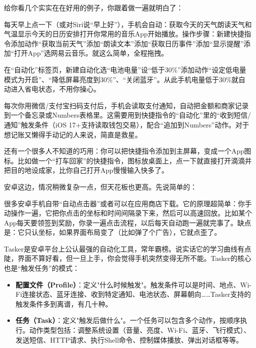 给你看几个实实在在好用的例子，你跟着做一遍就明白了：


每天早上点一下（或对Siri说“早上好”），手机会自动：获取今天的天气朗读天气和气温显示今天的日历安排打开你常用的音乐App开始播放。操作步骤：新建快捷指令添加动作“获取当前天气”添加“朗读文本”添加“获取日历事件”添加“显示提醒”添加“打开App”选网易云音乐。就这么简单，全程拖拽。


在“自动化”标签页，新建自动化选“电池电量”设“低于30\%”添加动作“设定低电量模式为开启”、“降低屏幕亮度到30\%”、“关闭蓝牙”。从此手机电量低于30\%就自动进入省电状态，不用你操心。


每次你用微信/支付宝扫码支付后，手机会读取支付通知，自动把金额和商家记录到一个备忘录或Numbers表格里。这需要用到快捷指令的“自动化”里的“收到短信/通知”触发条件（iOS 17+支持读取钱包交易），配合“追加到Numbers”动作。对于想记账又懒得手动记的人来说，简直是救星。

还有一个很多人不知道的巧用：你可以把快捷指令添加到主屏幕，变成一个App图标。比如做一个“打车回家”的快捷指令，图标放桌面上，点一下就直接打开滴滴并把目的地设成家，比你自己打开App慢慢输入快多了。


安卓这边，情况稍微复杂一点，但天花板也更高。先说简单的：


很多安卓手机自带“自动点击器”或者可以在应用商店下载。它的原理超简单：你手动操作一遍，它把你点击的坐标和时间间隔录下来，然后可以高速回放。比如某个App每天要领签到奖励，你录一遍点击流程，以后每天自动跑一遍就完事了。缺点是：它只认坐标，如果界面布局变了（比如弹了个广告），它就点歪了。


Tasker是安卓平台上公认最强的自动化工具，常年霸榜。说实话它的学习曲线有点陡，界面不算好看，但一旦上手，你会觉得手机突然变得无所不能。Tasker的核心也是“触发任务”的模式：

\begin{itemize}
  \item \textbf{配置文件（Profile）}：定义"什么时候触发"。触发条件可以是时间、地点、Wi-Fi连接状态、蓝牙连接、收到特定通知、电池状态、屏幕朝向……Tasker支持的触发条件多到离谱，有几十种。
  \item \textbf{任务（Task）}：定义"触发后做什么"。一个任务可以包含多个动作，按顺序执行。动作类型包括：调整系统设置（音量、亮度、Wi-Fi、蓝牙、飞行模式）、发送短信、HTTP请求、执行Shell命令、控制媒体播放、弹出对话框等等。
\end{itemize}

